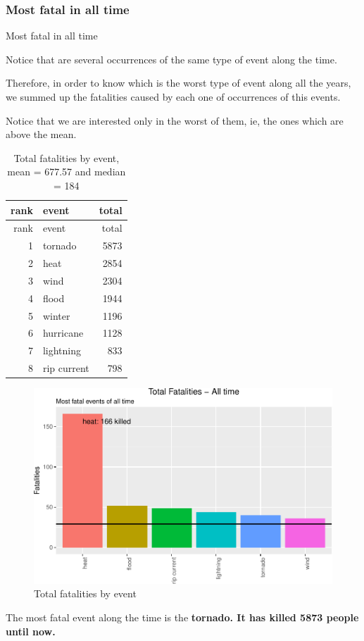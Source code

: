 \documentclass[]{article}
\begin{document}
\subsubsection{Most fatal in all time}\label{most-fatal-in-all-time}

Most fatal in all time

Notice that are several occurrences of the same type of event along the
time.

Therefore, in order to know which is the worst type of event along all
the years, we summed up the fatalities caused by each one of occurrences
of this events.

Notice that we are interested only in the worst of them, ie, the ones
which are above the mean.

\begin{longtable}[]{@{}rlr@{}}
\caption{Total fatalities by event, mean = 677.57 and median =
184}\tabularnewline
\toprule
rank & event & total\tabularnewline
\midrule
\endfirsthead
\toprule
rank & event & total\tabularnewline
\midrule
\endhead
1 & tornado & 5873\tabularnewline
2 & heat & 2854\tabularnewline
3 & wind & 2304\tabularnewline
4 & flood & 1944\tabularnewline
5 & winter & 1196\tabularnewline
6 & hurricane & 1128\tabularnewline
7 & lightning & 833\tabularnewline
8 & rip current & 798\tabularnewline
\bottomrule
\end{longtable}

\begin{figure}[htbp]
\centering
\includegraphics{readme_files/figure-latex/fatal-plot-alltime-1.pdf}
\caption{Total fatalities by event}
\end{figure}

The most fatal event along the time is the \textbf{tornado. It has
killed 5873 people until now.}
\end{document}
